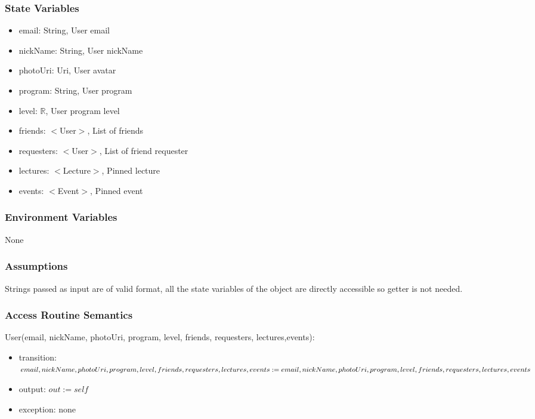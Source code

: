 \documentclass[12pt, titlepage]{article}
\begin{document}
\subsubsection{State Variables}

\begin{itemize}
\item email: String, User email
\item nickName: String, User nickName
\item photoUri: Uri, User avatar
\item program: String, User program
\item level: $\mathbb{R}$, User program level
\item friends: $<$User$>$, List of friends
\item requesters: $<$User$>$, List of friend requester
\item lectures: $<$Lecture$>$, Pinned lecture
\item events: $<$Event$>$, Pinned event
\end{itemize}

\subsubsection{Environment Variables}

None

\subsubsection{Assumptions}

Strings passed as input are of valid format, all the state variables of the object are directly accessible so getter is not needed.

\subsubsection{Access Routine Semantics}

\noindent User(email, nickName, photoUri, program, level, friends, requesters, lectures,events):
\begin{itemize}
\item transition: $email, nickName, photoUri, program, level, friends, requesters, lectures, events := \\ email, nickName, photoUri, program, level, friends, requesters, lectures, events$
\item output: $out := self$
\item exception: none
\end{itemize}
\end{document}
